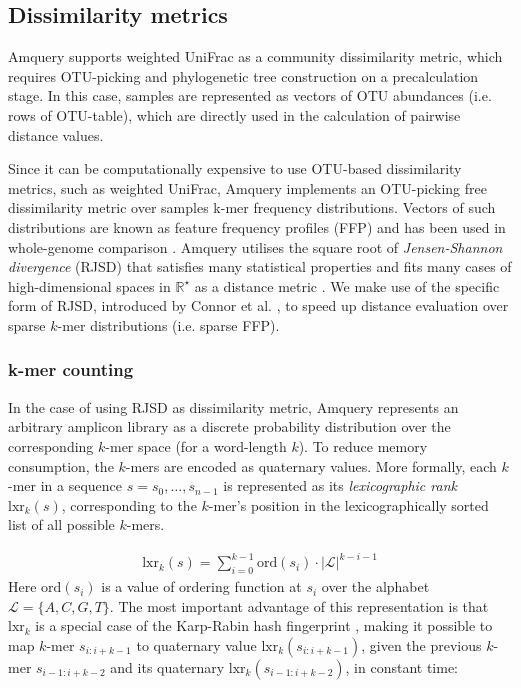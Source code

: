 \documentclass[10pt,letterpaper]{article}
\begin{document}
\subsection*{Dissimilarity metrics}
Amquery supports weighted UniFrac \cite{lozupone2011unifrac} as a community dissimilarity metric,
 which requires OTU-picking and phylogenetic tree construction on a precalculation stage. In this case, 
 samples are represented as vectors of OTU abundances (i.e. rows of OTU-table), which are directly used 
 in the calculation of pairwise distance values.


Since it can be computationally expensive to use OTU-based dissimilarity metrics, such as weighted UniFrac, Amquery 
implements an OTU-picking free dissimilarity metric over samples k-mer frequency distributions. Vectors of such distributions
are known as feature frequency profiles (FFP) and has been used in whole-genome comparison \cite{sims2009alignment}. 
Amquery utilises the square root of \textit{Jensen-Shannon divergence} (RJSD) \cite{lin1991divergence} that 
satisfies many statistical properties and fits many cases of high-dimensional spaces in $\mathbb{R^\star}$ as a distance 
metric \cite{fuglede2004jensen, endres2003new}. We make use of the specific form of RJSD, introduced 
by Connor et al. \cite{connor2013evaluation}, to speed up distance evaluation over sparse $k$-mer distributions (i.e. sparse FFP).


\subsubsection*{k-mer counting}
In the case of using RJSD as dissimilarity metric, Amquery represents an arbitrary amplicon library as a discrete 
probability distribution over the corresponding $k$-mer space (for a word-length $k$). 
To reduce memory consumption, the $k$-mers are encoded as quaternary values. 
More formally, each $k$-mer in a sequence $s = s_0,\dots,s_{n-1}$ is represented as its \textit{lexicographic rank} $\mathrm{lxr}_k(s)$, corresponding to the $k$-mer's position in the lexicographically sorted list of all possible $k$-mers.

\begin{eqnarray}
\label{eq:schemeP}
    \mathrm{lxr}_k(s) = \sum_{i=0}^{k−1} \mathrm{ord}(s_i) \cdot |{\mathcal{L}}|^{k−i−1}
\end{eqnarray}
Here $\mathrm{ord}(s_i)$ is a value of ordering function at $s_i$ over the alphabet ${\mathcal{L}} = \{A, C, G, T \}$. The most important advantage of this representation is that $\mathrm{lxr}_k$ is a special case of the Karp-Rabin hash fingerprint \cite{karp1987efficient}, making it possible to map $k$-mer $s_{i:i+k-1}$ to quaternary value $\mathrm{lxr}_k(s_{i:i+k-1})$, given the previous $k$-mer $s_{i−1:i+k-2}$ and its quaternary $\mathrm{lxr}_k(s_{i−1:i+k-2})$, in constant time:
\end{document}
